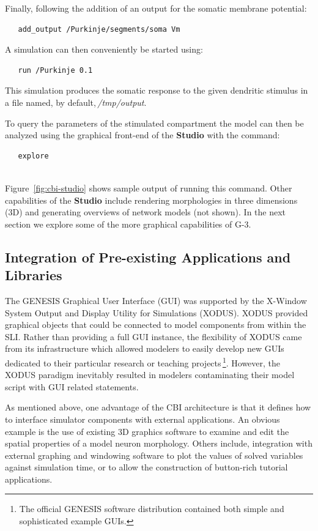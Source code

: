 \documentclass[10pt]{article}
\begin{document}
Finally, following the addition of an output for the somatic membrane potential:
\begin{verbatim}
   add_output /Purkinje/segments/soma Vm
\end{verbatim}
A simulation can then conveniently be started using:
\begin{verbatim}
   run /Purkinje 0.1
\end{verbatim}
This simulation produces the somatic response to the given dendritic stimulus in a file named, by default,\,{\it /tmp/output}.

To query the parameters of the stimulated compartment the model can
then be analyzed using the graphical front-end of the {\bf Studio}
with the command:

\begin{verbatim}
   explore
\end{verbatim}

\\

Figure~\ref{fig:cbi-studio} shows sample output of running this
command.  Other capabilities of the {\bf Studio} include rendering
morphologies in three dimensions (3D) and generating overviews of network
models (not shown).  In the next section we explore some of the more graphical
capabilities of G-3.

\subsection*{Integration of Pre-existing Applications and Libraries}

The GENESIS Graphical User Interface (GUI) was supported by the
X-Window System Output and Display Utility for Simulations (XODUS).
XODUS provided graphical objects that could be
connected to model components from within the SLI.  Rather than
providing a full GUI instance, the flexibility of XODUS came from its
infrastructure which allowed modelers to easily develop new GUIs
dedicated to their particular research or teaching projects\,\footnote{The
  official GENESIS software distribution contained both simple and
  sophisticated example GUIs.}.  However, the XODUS paradigm
inevitably resulted in modelers contaminating their model script with GUI
related statements.

As mentioned above, one advantage of the CBI architecture is that it defines how to interface simulator components
with external applications.  An obvious example is the use of existing
3D graphics software to examine and edit the spatial properties of a
model neuron morphology.  Others include, integration with external
graphing and windowing software to plot the values of solved
variables against simulation time, or to allow the construction of
button-rich tutorial applications.
\end{document}
